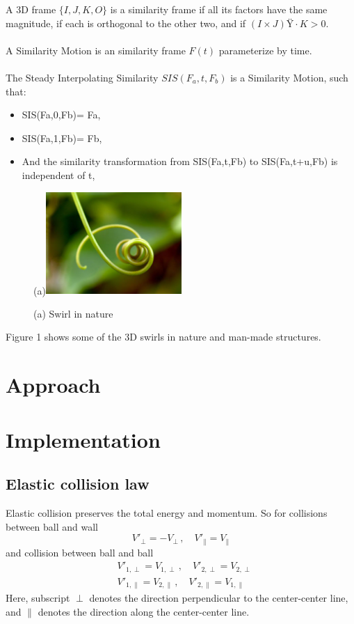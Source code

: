 \documentclass[twoside,11pt]{article}
\begin{document}
A 3D frame $\{I,J,K,O\}$ is a similarity frame if all its factors have the same magnitude, if each is orthogonal to the other two, and if $(I \times J) \cdot K>0$.\\
\\
A Similarity Motion is an similarity frame $F(t)$ parameterize by time.\\
\\
The Steady Interpolating Similarity $SIS(F_a,t,F_b)$ is a Similarity Motion, such that:
\begin{itemize}
\item SIS(Fa,0,Fb)= Fa,
\item SIS(Fa,1,Fb)= Fb,
\item And the similarity transformation from SIS(Fa,t,Fb) to SIS(Fa,t+u,Fb) is independent of t,
\end{itemize}

\begin{figure}[h]
  \centering
  (a)\includegraphics[width=0.46\textwidth]{plant}
  \caption{(a) Swirl in nature}
  \label{fig:time}
\end{figure}

Figure 1 shows some of the 3D swirls in nature and man-made structures.

\section{Approach}



\section{Implementation}

\subsection{Elastic collision law}
Elastic collision preserves the total energy and momentum. So 
for collisions between ball and wall 
\begin{equation}
  \label{eq:collisionBW}
  V'_{\perp} = - V_{\perp} \,,\quad V'_{\parallel} = V_{\parallel}
\end{equation}
and collision between ball and ball
\begin{align}
  \label{eq:collisionBB}
  & V'_{1, \perp} = V_{1, \perp} \,,\quad V'_{2, \perp} = V_{2, \perp} \\
  & V'_{1, \parallel} = V_{2, \parallel} \,,\quad V'_{2, \parallel} = V_{1, \parallel}
\end{align}
Here, subscript $\perp$ denotes the direction perpendicular to the
center-center line, and $\parallel$ denotes the direction along the
center-center
line.
\end{document}
